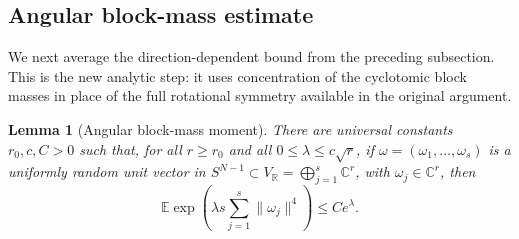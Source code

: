 \documentclass[11pt]{article}
\newtheorem{lemma}[theorem]{Lemma}
\theoremstyle{remark}
\newcommand{\R}{\mathbb R}
\newcommand{\C}{\mathbb C}
\newcommand{\E}{\mathbb E}
\begin{document}
\subsection{Angular block-mass estimate}\label{subsec:angular-block-mass}

We next average the direction-dependent bound from the preceding subsection.
This is the new analytic step: it uses concentration of the cyclotomic block
masses in place of the full rotational symmetry available in the original
argument.

\begin{lemma}[Angular block-mass moment]\label{lem:angular-moment}
There are universal constants $r_0,c,C>0$ such that, for all $r\ge r_0$ and all
$0\le\lambda\le c\sqrt r$, if
$\omega=(\omega_1,\dots,\omega_s)$ is a uniformly random unit vector in
$S^{N-1}\subset V_\R=\bigoplus_{j=1}^s\C^r$, with $\omega_j\in\C^r$, then
\[
        \E\exp\left(\lambda s\sum_{j=1}^s\|\omega_j\|^4\right)
        \le Ce^\lambda.
\]
\end{lemma}
\end{document}

